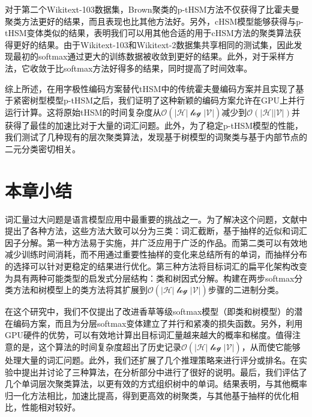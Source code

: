 对于第二个Wikitext-103数据集，Brown聚类的p-tHSM方法不仅获得了比霍夫曼聚类方法更好的结果，而且表现也比其他方法好。另外，cHSM模型能够获得与p-tHSM变体类似的结果，表明我们可以用其他合适的用于cHSM方法的聚类算法获得更好的结果。由于Wikitext-103和Wikitext-2数据集共享相同的测试集，因此发现最初的softmax通过更大的训练数据被收敛到更好的结果。此外，对于采样方法，它收敛于比softmax方法好得多的结果，同时提高了时间效率。

综上所述，在用字极性编码方案替代tHSM中的传统霍夫曼编码方案并且实现了基于紧密树型模型p-tHSM之后，我们证明了这种新颖的编码方案允许在GPU上并行运行计算。这将原始tHSM的时间复杂度从$ \mathcal {O(| H | \log | V |)} $减少到$\mathcal{O(| H || V |)} $并获得了最佳的加速比对于大量的词汇问题。此外，为了稳定p-tHSM模型的性能，我们测试了几种现有的层次聚类算法，发现基于树模型的词聚类与基于内部节点的二元分类密切相关。

\section{本章小结}

词汇量过大问题是语言模型应用中最重要的挑战之一。为了解决这个问题，文献中提出了各种方法，这些方法大致可以分为三类：词汇截断，基于抽样的近似和词汇因子分解。第一种方法易于实施，并广泛应用于广泛的作品。而第二类可以有效地减少训练时间消耗，而不用通过重要性抽样的变化来总结所有的单词，而抽样分布的选择可以针对更稳定的结果进行优化。第三种方法将目标词汇的扁平化架构改变为具有两种可能类型的启发式分层结构：类和树因式分解。构建在两步softmax分类方法和树模型上的类方法将其扩展到$\mathcal {O(| H | \log | V |)} $步骤的二进制分类。

在这个研究中，我们不仅提出了改进香草等级softmax模型（即类和树模型）的潜在编码方案，而且为分层softmax变体建立了并行和紧凑的损失函数。另外，利用GPU硬件的优势，可以有效地计算出目标词汇量越来越大的概率和梯度。值得注意的是，这个算法的时间复杂度超出了历史记录$ \mathcal {O(| H | \log | V |)}$，从而使它能够处理大量的词汇问题。此外，我们还扩展了几个推理策略来进行评分或排名。在实验中提出并讨论了三种算法，在分析部分中进行了很好的说明。最后，我们评估了几个单词层次聚类算法，以更有效的方式组织树中的单词。结果表明，与其他概率归一化方法相比，加速比提高，得到更高效的树聚类，与其他基于抽样的优化相比，性能相对较好。

